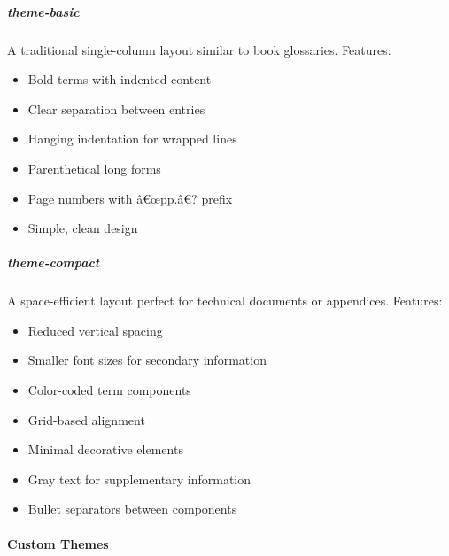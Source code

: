 \subparagraph{theme-basic}\label{theme-basic}

A traditional single-column layout similar to book glossaries. Features:

\begin{itemize}
\tightlist
\item
  Bold terms with indented content
\item
  Clear separation between entries
\item
  Hanging indentation for wrapped lines
\item
  Parenthetical long forms
\item
  Page numbers with â€œpp.â€? prefix
\item
  Simple, clean design
\end{itemize}

\begin{Shaded}
\begin{Highlighting}[]
\end{Highlighting}
\end{Shaded}

\subparagraph{theme-compact}\label{theme-compact}

A space-efficient layout perfect for technical documents or appendices.
Features:

\begin{itemize}
\tightlist
\item
  Reduced vertical spacing
\item
  Smaller font sizes for secondary information
\item
  Color-coded term components
\item
  Grid-based alignment
\item
  Minimal decorative elements
\item
  Gray text for supplementary information
\item
  Bullet separators between components
\end{itemize}

\begin{Shaded}
\begin{Highlighting}[]
\end{Highlighting}
\end{Shaded}

\paragraph{Custom Themes}\label{custom-themes}

